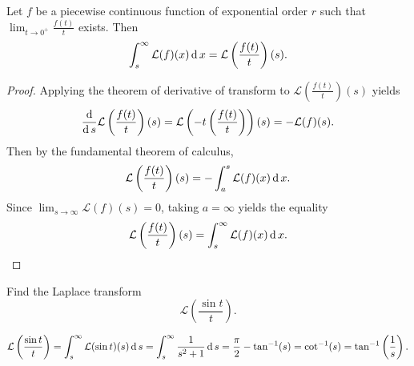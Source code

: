 \begin{theorem}
  Let $f$ be a piecewise continuous function of exponential order $r$ such that $\lim_{t\to 0^+}\frac{f(t)}{t}$ exists. Then
  \[\int_s^\infty \mathcal{L}(f)(x)\operatorname{d} x=\mathcal{L}\left(\frac{f(t)}{t}\right)(s).\]
\end{theorem}
\begin{proof}
  Applying the theorem of derivative of transform to $\mathcal{L}\left(\frac{f(t)}{t}\right)(s)$ yields
  \[\frac{\operatorname{d} }{\operatorname{d} s}\mathcal{L}\left(\frac{f(t)}{t}\right)(s)=\mathcal{L}\left(-t\left(\frac{f(t)}{t}\right)\right)(s)=-\mathcal{L}(f)(s).\]
  Then by the fundamental theorem of calculus,
  \[\mathcal{L}\left(\frac{f(t)}{t}\right)(s)=-\int_a^s \mathcal{L}(f)(x)\operatorname{d} x.\]
  Since $\lim_{s\to\infty}\mathcal{L}(f)(s)=0$, taking $a=\infty$ yields the equality
  \[\mathcal{L}\left(\frac{f(t)}{t}\right)(s)=\int_s^\infty \mathcal{L}(f)(x)\operatorname{d} x.\]
\end{proof}



\begin{example}
  Find the Laplace transform
  \[\mathcal{L}\left(\frac{\sin t}{t}\right).\]
\end{example}
\begin{solution}
  \[
    \mathcal{L}\left(\frac{\sin t}{t}\right)
    =\int_s^\infty\mathcal{L}(\sin t)(s)\operatorname{d} s
    =\int_s^\infty\frac{1}{s^2+1}\operatorname{d} s
    =\frac{\pi}{2}-\tan^{-1}(s)
    =\cot^{-1}(s)
    =\tan^{-1}\left(\frac1s\right).
  \]
\end{solution}

